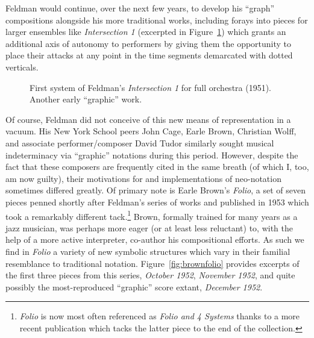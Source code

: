     Feldman would continue, over the next few years, to develop his ``graph'' compositions alongside his more traditional works, including forays into pieces for larger ensembles like \textit{Intersection 1} (excerpted in Figure~\ref{fig:feldman2}) which grants an additional axis of autonomy to performers by giving them the opportunity to place their attacks at any point in the time segments demarcated with dotted verticals.

        \begin{figure}
            \centering
            \captionsetup{width=.5\textwidth}
            \caption[First system of Feldman's \textit{Intersection 1} for full orchestra (1951). Another early ``graphic'' work.]{First system of Feldman's \textit{Intersection 1} for full orchestra (1951). Another early ``graphic'' work.\footnotemark}
            \label{fig:feldman2}
        \end{figure}

    Of course, Feldman did not conceive of this new means of representation in a vacuum. His New York School peers John Cage, Earle Brown, Christian Wolff, and associate performer/composer David Tudor similarly sought musical indeterminacy via ``graphic'' notations during this period. However, despite the fact that these composers are frequently cited in the same breath (of which I, too, am now guilty), their motivations for and implementations of neo-notation sometimes differed greatly. Of primary note is Earle Brown's \textit{Folio}, a set of seven pieces penned shortly after Feldman's series of works and published in 1953 which took a remarkably different tack.\footnote{\textit{Folio} is now most often referenced as \textit{Folio and 4 Systems} thanks to a more recent publication which tacks the latter piece to the end of the collection.} Brown, formally trained for many years as a jazz musician, was perhaps more eager (or at least less reluctant) to, with the help of a more active interpreter, co-author his compositional efforts.\autocite{Ryan_2002} As such we find in \textit{Folio} a variety of new symbolic structures which vary in their familial resemblance to traditional notation. Figure~\ref{fig:brownfolio} provides excerpts of the first three pieces from this series, \textit{October 1952}, \textit{November 1952}, and quite possibly the most-reproduced ``graphic'' score extant, \textit{December 1952}.

